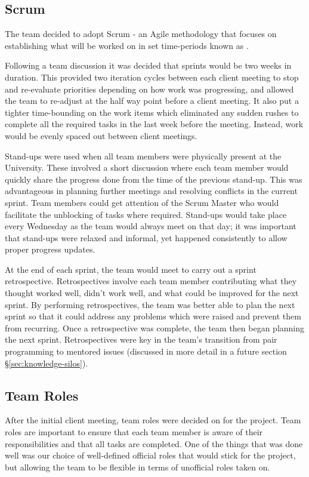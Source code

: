 \documentclass{l3proj}
\begin{document}
\subsection{Scrum}
The team decided to adopt Scrum - an Agile methodology that focuses on establishing what will be worked on in set time-periods known as .

Following a team discussion it was decided that sprints would be two weeks in duration. This provided two iteration cycles between each client meeting to stop and re-evaluate priorities depending on how work was progressing, and allowed the team to re-adjust at the half way point before a client meeting. It also put a tighter time-bounding on the work items which eliminated any sudden rushes to complete all the required tasks in the last week before the meeting. Instead, work would be evenly spaced out between client meetings.

Stand-ups were used when all team members were physically present at the University. These involved a short discussion where each team member would quickly share the progress done from the time of the previous stand-up. This was advantageous in planning further meetings and resolving conflicts in the current sprint. Team members could get attention of the Scrum Master who would facilitate the unblocking of tasks where required. Stand-ups would take place every Wednesday as the team would always meet on that day; it was important that stand-ups were relaxed and informal, yet happened consistently to allow proper progress updates.

At the end of each sprint, the team would meet to carry out a sprint retrospective. Retrospectives involve each team member contributing what they thought worked well, didn't work well, and what could be improved for the next sprint. By performing retrospectives, the team was better able to plan the next sprint so that it could address any problems which were raised and prevent them from recurring. Once a retrospective was complete, the team then began planning the next sprint. Retrospectives were key in the team's transition from pair programming to mentored issues (discussed in more detail in a future section \S\ref{sec:knowledge-silos}).

\subsection{Team Roles}
After the initial client meeting, team roles were decided on for the project. Team roles are important to ensure that each team member is aware of their responsibilities and that all tasks are completed. One of the things that was done well was our choice of well-defined official roles that would stick for the project, but allowing the team to be flexible in terms of unofficial roles taken on.
\end{document}

